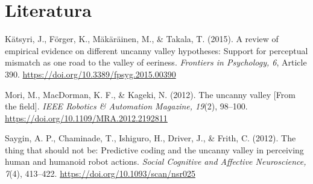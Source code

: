 \documentclass[11pt,a4paper]{article}
\begin{document}
\section*{Literatura}
\begin{description}
\item Kätsyri, J., Förger, K., Mäkäräinen, M., \& Takala, T. (2015). A review of empirical evidence on different uncanny valley hypotheses: Support for perceptual mismatch as one road to the valley of eeriness. \textit{Frontiers in Psychology, 6}, Article 390. \url{https://doi.org/10.3389/fpsyg.2015.00390}
\item Mori, M., MacDorman, K. F., \& Kageki, N. (2012). The uncanny valley [From the field]. \textit{IEEE Robotics \& Automation Magazine, 19}(2), 98--100. \url{https://doi.org/10.1109/MRA.2012.2192811}
\item Saygin, A. P., Chaminade, T., Ishiguro, H., Driver, J., \& Frith, C. (2012). The thing that should not be: Predictive coding and the uncanny valley in perceiving human and humanoid robot actions. \textit{Social Cognitive and Affective Neuroscience, 7}(4), 413--422. \url{https://doi.org/10.1093/scan/nsr025}
\end{description}
\end{document}
